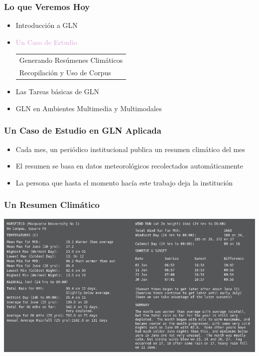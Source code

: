 \documentclass[compress,color=usenames]{beamer}
\newcommand{\mH}[1]{\textcolor{Plum}{#1}}
\begin{document}
\begin{frame}
\frametitle{Lo que Veremos Hoy}

\begin{itemize}
\item  Introducci\'on a GLN 
\item  \mH{Un Caso de Estudio}
\begin{tabular}{|l}
Generando Res\'umenes Clim\'aticos\\
Recopilaci\'on y Uso de Corpus\\
\end{tabular}
\item  Las Tareas b\'asicas de GLN
\item  GLN en Ambientes Multimedia y Multimodales
\end{itemize}
\end{frame}


\begin{frame}
\frametitle{Un Caso de Estudio en GLN Aplicada}

\begin{itemize}
\item Cada mes, un peri\'odico institucional publica un resumen clim\'atico del mes
\item El resumen se basa en datos meteorol\'ogicos recolectados autom\'aticamente
\item La persona que hasta el momento hac\'ia este trabajo deja la instituci\'on
\end{itemize}

\end{frame}

\begin{frame}
\frametitle{Un Resumen Clim\'atico}

\begin{center}
\includegraphics[scale=.47]{pics/pic5.jpg}
\end{center}

\end{frame}
\end{document}
